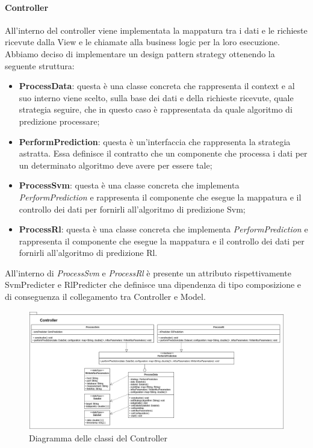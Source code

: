 			\paragraph{Controller}
			All'interno del controller viene implementata la mappatura tra i dati e le richieste ricevute dalla View e le chiamate alla business logic per la loro esecuzione. Abbiamo deciso di implementare un design pattern strategy ottenendo la seguente struttura:
			\begin{itemize}
				\item \textbf{ProcessData}: questa è una classe concreta che rappresenta il context e al suo interno viene scelto, sulla base dei dati e della richieste ricevute, quale strategia seguire, che in questo caso è rappresentata da quale algoritmo di predizione processare;
				\item \textbf{PerformPrediction}: questa è un'interfaccia che rappresenta la strategia astratta. Essa definisce il contratto che un componente che processa i dati per un determinato algoritmo deve avere per essere tale;
				\item \textbf{ProcessSvm}: questa è una classe concreta che implementa \textit{PerformPrediction} e rappresenta il componente che esegue la mappatura e il controllo dei dati per fornirli all'algoritmo di predizione Svm;
				\item \textbf{ProcessRl}: questa è una classe concreta che implementa \textit{PerformPrediction} e rappresenta il componente che esegue la mappatura e il controllo dei dati per fornirli all'algoritmo di predizione Rl.
			\end{itemize}
			All'interno di \textit{ProcessSvm} e \textit{ProcessRl} è presente un attributo rispettivamente SvmPredicter e RlPredicter che definisce una dipendenza di tipo composizione e di conseguenza il collegamento tra Controller e Model.
			\mbox{}
			\begin{landscape}
			\begin{figure} [H]
				\includegraphics[width=\linewidth]{./img/Diagrammi/d3.png}
				\caption{Diagramma delle classi del Controller}
			\end{figure}
		\end{landscape}
